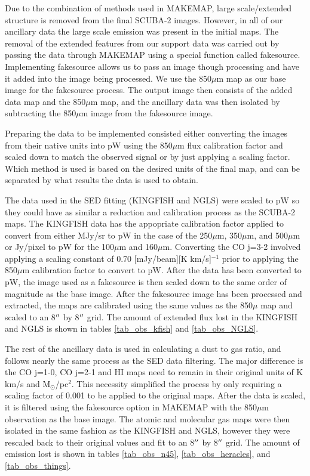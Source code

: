 
Due to the combination of methods used in MAKEMAP, large scale/extended structure is removed from the final SCUBA-2 images.  However, in all of our ancillary data the large scale emission was present in the initial maps.  The removal of the extended features from our support data was carried out by passing the data through MAKEMAP using a special function called fakesource.  Implementing fakesource allows us to pass an image though processing and have it added into the image being processed.  We use the 850$\mu$m map as our base image for the fakesource process.  The output image then consists of the added data map and the 850$\mu$m map, and the ancillary data was then isolated by subtracting the 850$\mu$m image from the fakesource image.  

Preparing the data to be implemented consisted either converting the images from their native units into pW using the 850$\mu$m flux calibration factor and scaled down to match the observed signal or by just applying a scaling factor.  Which method is used is based on the desired units of the final map, and can be separated by what results the data is used to obtain.

The data used in the SED fitting (KINGFISH and NGLS) were scaled to pW so they could have as similar a reduction and calibration process as the SCUBA-2 maps.   The KINGFISH data has the appopriate calibration factor applied to convert from either MJy/sr to pW in the case of the 250$\mu$m, 350$\mu$m, and 500$\mu$m or Jy/pixel to pW for the 100$\mu$m and 160$\mu$m.  Converting the CO j=3-2 involved applying a scaling constant of 0.70 [mJy/beam][K km/s]$^{-1}$ \citep{drabek2012} prior to applying the 850$\mu$m calibration factor to convert to pW.  After the data has been converted to pW, the image used as a fakesource is then scaled down to the same order of magnitude as the base image.  After the fakesource image has been processed and extracted, the maps are calibrated using the same values as the 850$\mu$ map and scaled to an 8$\mbox{$^{\prime\prime}$}$ by 8$\mbox{$^{\prime\prime}$}$ grid.  The amount of extended flux lost in the KINGFISH and NGLS is shown in tables \ref{tab_obs_kfish} and \ref{tab_obs_NGLS}.

The rest of the ancillary data is used in calculating a dust to gas ratio, and follows nearly the same process as the SED data filtering.  The major difference is the CO j=1-0, CO j=2-1 and HI maps need to remain in their original units of K km/s and M$_\odot$/pc$^2$.  This necessity simplified the process by only requiring a scaling factor of 0.001 to be applied to the original maps.  After the data is scaled, it is filtered using the fakesource option in MAKEMAP with the 850$\mu$m observation as the base image.  The atomic and molecular gas maps were then isolated in the same fashion as the KINGFISH and NGLS, however they were rescaled back to their original values and fit to an 8$\mbox{$^{\prime\prime}$}$ by 8$\mbox{$^{\prime\prime}$}$ grid.  The amount of emission lost is shown in tables \ref{tab_obs_n45}, \ref{tab_obs_heracles}, and \ref{tab_obs_things}.
